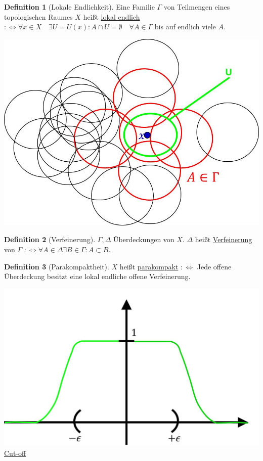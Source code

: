 \documentclass[a4paper,11pt,notitlepage]{report}
\theoremstyle{remark}
\theoremstyle{definition}
\newtheorem{definition}{Definition}[chapter]
\begin{document}
\begin{definition}[Lokale Endlichkeit]
	Eine Familie $\Gamma$ von Teilmengen eines topologischen Raumes $X$ heißt \underline{lokal endlich} $:\Leftrightarrow \forall x \in X \quad \exists U = U(x) \colon A \cap U = \emptyset \quad \forall A \in \Gamma$ bis auf endlich viele $A$.
\end{definition}
\begin{center}
	\includegraphics[scale=0.5]{images/lokal_endlich.jpg}
\end{center} 
 
\begin{definition}[Verfeinerung]
	$\Gamma, \Delta$ Überdeckungen von $X$. $\Delta$ heißt \underline{Verfeinerung} von $\Gamma$ \newline $:\Leftrightarrow \forall A \in \Delta \exists B \in \Gamma \colon A \subset B$.
\end{definition} 

\begin{definition}[Parakompaktheit]
	$X$ heißt \underline{parakompakt} $:\Leftrightarrow$ Jede offene Überdeckung besitzt eine lokal endliche offene Verfeinerung. 
\end{definition}

\includegraphics[scale=0.5]{images/Cutoff.jpg} \underline{\underline{Cut-off}}
\end{document}
